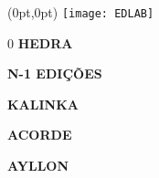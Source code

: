 \begin{textblock*}{5.625in}(0pt,0pt)%
\vspace*{-3cm}
\hspace*{-2.1cm}\texttt{[image: EDLAB]}
\end{textblock*}

\pagebreak

\pagestyle{indice}

{}

\vspace{1.2cm}

{\LARGE

\hspace*{6.8cm}0\pageref{hedra} \textbf{HEDRA}

\hspace*{6.8cm}\pageref{n-1} \textbf{N-1 EDIÇÕES}

\hspace*{6.8cm}\pageref{kalinka} \textbf{KALINKA}

\hspace*{6.8cm}\pageref{acorde} \textbf{ACORDE}

\hspace*{6.8cm}\pageref{ayllon} \textbf{AYLLON}\\






}

